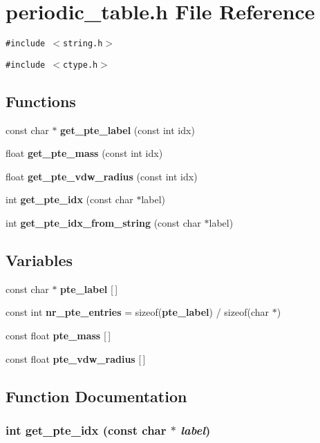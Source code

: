 \section{periodic\_\-table.h File Reference}
\label{periodic__table_8h}
{\tt \#include $<$string.h$>$}\par
{\tt \#include $<$ctype.h$>$}\par
\subsection*{Functions}
\begin{CompactItemize}
\item 
const char $\ast$ {\bf get\_\-pte\_\-label} (const int idx)
\item 
float {\bf get\_\-pte\_\-mass} (const int idx)
\item 
float {\bf get\_\-pte\_\-vdw\_\-radius} (const int idx)
\item 
int {\bf get\_\-pte\_\-idx} (const char $\ast$label)
\item 
int {\bf get\_\-pte\_\-idx\_\-from\_\-string} (const char $\ast$label)
\end{CompactItemize}
\subsection*{Variables}
\begin{CompactItemize}
\item 
const char $\ast$ {\bf pte\_\-label} [$\,$]
\item 
const int {\bf nr\_\-pte\_\-entries} = sizeof({\bf pte\_\-label}) / sizeof(char $\ast$)
\item 
const float {\bf pte\_\-mass} [$\,$]
\item 
const float {\bf pte\_\-vdw\_\-radius} [$\,$]
\end{CompactItemize}


\subsection{Function Documentation}
\subsubsection{\setlength{\rightskip}{0pt plus 5cm}int get\_\-pte\_\-idx (const char $\ast$ {\em label})\hspace{0.3cm}{\tt  [static]}}\label{periodic__table_8h_a7}




